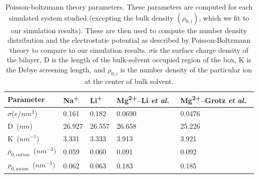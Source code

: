 \documentclass[journal=langd5,manuscript=article]{achemso}
\newcommand{\etal}{\textit{et al.}~}
\newcommand{\na}{Na\textsuperscript{+}~}
\newcommand{\li}{Li\textsuperscript{+}~}
\newcommand{\mgmbnbfix}{Mg\textsuperscript{2+}--Li \etal} %
\newcommand{\mgmicro}{Mg\textsuperscript{2+}--Grotz \etal}
\newcommand{\sig}{$\sigma$}
\begin{document}
\begin{table}
    \caption{Poisson-boltzmann theory parameters. These parameters are computed for each
    simulated system studied (excepting the bulk density $(\rho_{0,i})$, 
    which we fit to our simulation results). These are then used to compute the
    number density distribution and the electrostatic potential as described by 
    Poisson-Boltzmann theory to compare to our simulation results.
    \sig is the surface charge density of the bilayer, D is the length
    of the bulk-solvent occupied region of the box, K is the Debye
    screening length, and $\rho_{0,i}$ is the number density of the particular 
    ion at the center of bulk solvent.}
    \label{tab:gctheory}
    \begin{tabularx}{\textwidth}{|X|X|X|X|X|}\hline
        Parameter                    & \na  & \li    & \mgmbnbfix    & \mgmicro \\\hline
        \sig ($e/nm^{2}$)            &0.161 &0.182   &0.0690  &0.0476     \\\hline
        D~($nm$)                     &26.927&26.557  &26.658  &25.226     \\\hline
        K~($nm^{-1}$)                &3.331 &3.333   &3.913   &3.921      \\\hline
        $\rho_{0,cation}$~($nm^{-3})$&0.059 &0.060   &0.091   &0.092      \\\hline
        $\rho_{0,anion}$~($nm^{-3})$ &0.062 &0.063   &0.183   &0.185      \\\hline
    \end{tabularx}
\end{table}
\clearpage
\end{document}

